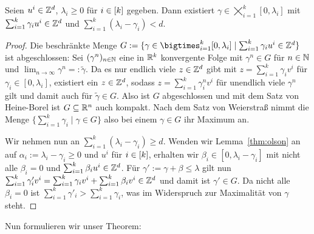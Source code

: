 \begin{lemma}\label{lem:maxgamma}
	Seien $u^i\in\mathbb{Z}^d$, $\lambda_i\geq0$ für $i\in[k]$ gegeben.
	Dann existiert $\gamma\in\bigtimes_{i=1}^k [0,\lambda_i]$ mit $\sum_{i=1}^k \gamma_i u^i\in\mathbb{Z}^d$ und  $\sum_{i=1}^k(\lambda_i-\gamma_i)<d$.
\end{lemma}
\begin{proof}
	Die beschränkte Menge $G:=\{\gamma \in \bigtimes_{i=1}^k [0,\lambda_i] \mid \sum_{i=1}^k \gamma_i u^i\in\Z^d \}$ ist abgeschlossen: Sei $(\gamma^n)_{n\in\mathbb{N}}$ eine in $\mathbb{R}^k$ konvergente Folge mit $\gamma^n\in G$ für $n\in\mathbb{N}$ und $\lim_{n\to\infty}\gamma^n=:\tilde{\gamma}$.
	Da es nur endlich viele $z\in\mathbb{Z}^d$ gibt mit $z=\sum_{i=1}^k\gamma_iv^i$ für $\gamma_i\in[0,\lambda_i]$, existiert ein $z\in\mathbb{Z}^d$, sodass $z=\sum_{i=1}^k\gamma^n_iv^i$ für unendlich viele $\gamma^n$ gilt und damit auch für $\tilde{\gamma}\in G$.
	Also ist $G$ abgeschlossen und mit dem Satz von Heine-Borel ist $G\subseteq\mathbb{R}^n$ auch kompakt.
	Nach dem Satz von Weierstraß nimmt die Menge $\{ \sum_{i=1}^k\gamma_i \mid \gamma\in G \}$ also bei einem $\gamma\in G$ ihr Maximum an.
	
	Wir nehmen nun an $\sum_{i=1}^k(\lambda_i - \gamma_i) \geq d$.
	Wenden wir Lemma~\ref{thm:olson} an auf $\alpha_i:=\lambda_i-\gamma_i\geq0$ und $u^i$ für $i\in[k]$, erhalten wir $\beta_i\in[0,\lambda_i-\gamma_i]$ mit nicht alle $\beta_i=0$ und $\sum_{i=1}^k \beta_i u^i\in\mathbb{Z}^d$.
	Für $\gamma':=\gamma+\beta\leq\lambda$ gilt nun 
	$
	\sum_{i=1}^k\gamma'_iv^i = \sum_{i=1}^k\gamma_iv^i + \sum_{i=1}^k \beta_iv^i\in\mathbb{Z}^d
	$
	und damit ist $\gamma'\in G$.
	Da nicht alle $\beta_i=0$ ist $\sum_{i=1}^k\gamma'_i > \sum_{i=1}^k\gamma_i$, was im Widerspruch zur Maximalität von $\gamma$ steht.
\end{proof}
Nun formulieren wir unser Theorem:

